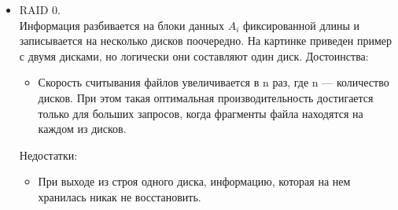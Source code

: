 \begin {itemize}
\item RAID 0. \\
Информация разбивается на блоки данных $A_{i}$ фиксированной длины и записывается на несколько дисков поочередно. На картинке приведен пример с двумя дисками, но логически они составляют один диск. 
Достоинства:
\begin {itemize}
\item Скорость считывания файлов увеличивается в n раз, где n — количество дисков. При этом такая оптимальная производительность достигается только для больших запросов, когда фрагменты файла находятся на каждом из дисков.
\end {itemize}

Недостатки:
\begin {itemize}
\item При выходе из строя одного диска, информацию, которая на нем хранилась никак не восстановить.
\end {itemize}



\end{itemize}
